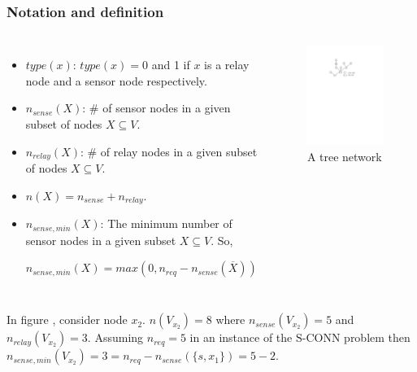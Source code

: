 \documentclass{beamer}
\newcommand{\SCONN}   { {\mathrm {S\mbox{-}CONN}} }
\begin{document}
\begin{frame}
\frametitle{Notation and definition}
\begin{columns}[t]
\vspace{-1.7em}
\begin{itemize}
\item	$type(x)$: $type(x)= 0$ and 1 if $x$ is a relay node and 
 a sensor node respectively.

\item	$n_{sense}(X)$: \# of sensor nodes in a given subset  of nodes $X\subseteq V$.

\item   $n_{relay}(X)$: \# of relay nodes in a given subset of nodes $X\subseteq V$.

\item $n(X)=n_{sense} + n_{relay}$.

\item $n_{sense,min}(X)$: The minimum number of sensor nodes in a given subset $X\subseteq V$. So,\\
\centerline{
$n_{sense,min}(X)=max(0,n_{req}-n_{sense}(\overline{X}))$
}
\end{itemize}
\begin{figure}[!htb]
\centering
\includegraphics[width=1.7 in, height=0.8 in]{Ch4f1.pdf}
 \caption{ A tree network}
\label{fig:es31}
\end{figure}
\end{columns}

\begin{example}
\normalfont
In figure , consider node $x_2$. $n(V_{x_2})=8$ where $n_{sense}(V_{x_2})=5$ and $n_{relay}(V_{x_2})=3$. Assuming $n_{req}=5$ in an instance of the $\SCONN$ problem then $n_{sense,min}(V_{x_2})=3=n_{req}-n_{sense}(\{s,x_1\})=5-2$. 
\end{example}
\end{frame}
\end{document}
